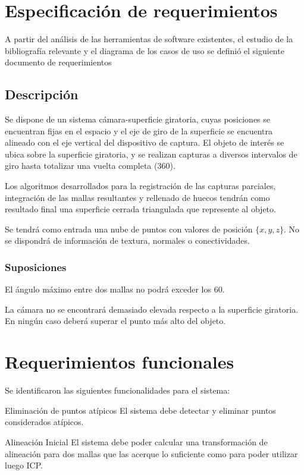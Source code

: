 \section{Especificación de requerimientos}
A partir del análisis de las herramientas de software existentes,
el estudio de la bibliografía relevante y el diagrama de los casos de uso
se definió el siguiente documento de requerimientos

\subsection{Descripción}
	Se dispone de un sistema cámara-superficie giratoria, cuyas posiciones
	se encuentran fijas en el espacio y el eje de giro de la superficie se
	encuentra alineado con el eje vertical del dispositivo de captura.
	El objeto de interés se ubica sobre la superficie giratoria, y se
	realizan capturas a diversos intervalos de giro
	hasta totalizar una vuelta completa (360\textdegree).

	Los algoritmos desarrollados para la registración de las capturas parciales,
	integración de las mallas resultantes y rellenado de huecos tendrán como resultado final
	una superficie cerrada triangulada que represente al objeto.

	Se tendrá como entrada una nube de puntos con valores de posición $\{x, y, z\}$.
	No se dispondrá de información de textura, normales o conectividades.

	\subsubsection{Suposiciones}
		El ángulo máximo entre dos mallas no podrá exceder los 60\textdegree.

		La cámara no se encontrará demasiado elevada respecto a la
		superficie giratoria. En ningún caso deberá superar el punto más alto del objeto.

\section{Requerimientos funcionales}
Se identificaron las siguientes funcionalidades para el sistema:

	\Requerimiento
		{Eliminación de puntos atípicos}
		{El sistema debe detectar y eliminar puntos considerados atípicos.}

	\Requerimiento
		{Alineación Inicial}
		{El sistema debe poder calcular una transformación de alineación para dos mallas
		que las acerque lo suficiente como para poder utilizar luego ICP.}

